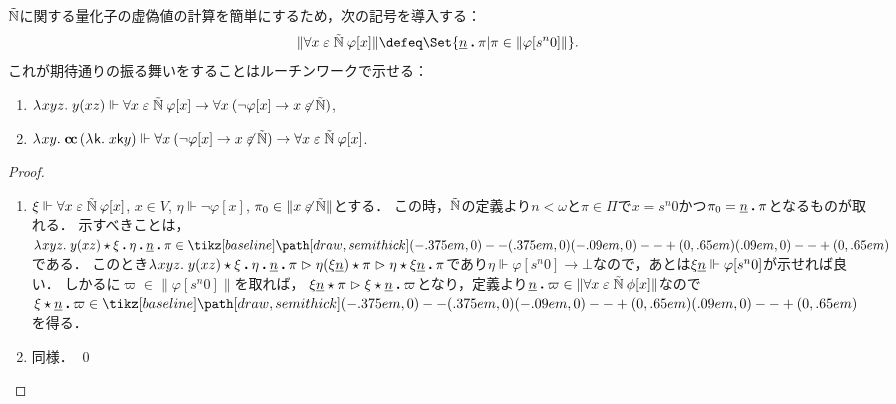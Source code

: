 \documentclass[realisability.tex]{subfiles}
\begin{document}
$\mathord{\tilde{\mathbb{N}}}$に関する量化子の虚偽値の計算を簡単にするため，次の記号を導入する：
\[
 \|\forall x \strin \NN\: \varphi[x]\| \defeq \Set{ \underline{n} \push \pi | {\pi \in \|\varphi[s^n 0]\|}}.
\]
これが期待通りの振る舞いをすることはルーチンワークで示せる：
\begin{lemma}
 \begin{enumerate}
  \item $\lambda^{\mathsf{}}xyz.\;y(xz) \Vdash \forall x \mathrel{\varepsilon} \mathord{\tilde{\mathbb{N}}} \: \varphi[x] \to \forall x \:(\neg \varphi[x] \to x \not\mathrel{\varepsilon} \mathord{\tilde{\mathbb{N}}})$,
  \item $\lambda^{\mathsf{}}xy.\;\mathsf{\mathbf{c\hspace{-1pt}c}} \,(\lambda^{\mathsf{}}\mathsf{k}.\;x \mathsf{k} y) \Vdash \forall x \:(\neg \varphi[x] \to x \not\mathrel{\varepsilon} \mathord{\tilde{\mathbb{N}}}) \to \forall x \mathrel{\varepsilon} \mathord{\tilde{\mathbb{N}}} \: \varphi[x]$.
 \end{enumerate}
\end{lemma}
\begin{proof}
 \begin{enumerate}
  \item $\xi \Vdash \forall x \mathrel{\varepsilon} \mathord{\tilde{\mathbb{N}}}\: \varphi[x]$, $x \in V$, $\eta \Vdash \neg \varphi[x]$, $\pi_0 \in \|x \not\mathrel{\varepsilon} \mathord{\tilde{\mathbb{N}}}\|$とする．
        この時，$\mathord{\tilde{\mathbb{N}}}$の定義より$n < \omega$と$\pi \in \Pi$で$x = s^n 0$かつ$\pi_0 = \underline{n} \mathbin{\boldsymbol{.}} \pi$となるものが取れる．
        示すべきことは，$\KVM{{\abs{xyz}{y(xz)}}{\xi}{\eta}{\num{n}}{\pi}} \in \pole$である．
        このとき$\KVM{{\abs{xyz}{y(xz)}}{\xi}{\eta}{\num{n}}{\pi}} \reds \KVM{{\eta(\xi \num{n})}{\pi}} \redsto \KVM{{\eta}{{\xi \num{n}}}{\pi}}$であり$\eta \Vdash \varphi[s^n 0] \to \bot$なので，あとは$\xi \underline{n} \Vdash \varphi[s^n 0]$が示せれば良い．
        しかるに$\varpi \in \|\varphi[s^n 0]\|$を取れば，
        $\KVM{{\xi \num{n}} \pi} \redsto \KVM{\xi {{\num{n}}} \varpi}$となり，定義より$\underline{n} \mathbin{\boldsymbol{.}} \varpi \in \|\forall x \mathrel{\varepsilon} \mathord{\tilde{\mathbb{N}}}\: \phi[x]\|$なので$\KVM{\xi{{\num{n}}} \varpi} \in \pole$を得る．
  \item 同様． \qed
 \end{enumerate}
\end{proof}
\end{document}
